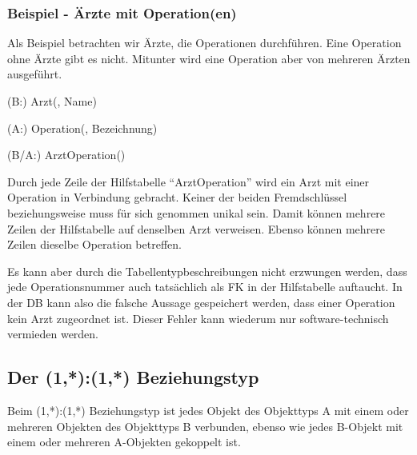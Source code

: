         \subsubsection{Beispiel - \"Arzte mit Operation(en)}
          Als Beispiel betrachten wir \"Arzte, die Operationen durchf\"uhren. Eine Operation ohne \"Arzte gibt es nicht. Mitunter wird eine Operation aber von mehreren \"Arzten ausgef\"uhrt.
          \begin{center}
          \end{center}
          \begin{small}
            (B:) Arzt(, Name)

            (A:) Operation(, Bezeichnung)

            (B/A:) ArztOperation()
          \end{small}
          Durch jede Zeile der Hilfstabelle \enquote{ArztOperation} wird ein Arzt mit einer Operation in Verbindung gebracht. Keiner der beiden Fremdschl\"ussel  beziehungsweise  muss f\"ur sich genommen unikal sein. Damit k\"onnen mehrere Zeilen der Hilfstabelle auf denselben Arzt verweisen. Ebenso k\"onnen mehrere Zeilen dieselbe Operation betreffen.

          Es kann aber durch die Tabellentypbeschreibungen nicht erzwungen werden, dass jede Operationsnummer auch tats\"achlich als FK in der Hilfstabelle auftaucht. In der DB kann also die falsche Aussage gespeichert werden, dass einer Operation kein Arzt zugeordnet ist. Dieser Fehler kann wiederum nur software-technisch vermieden werden.
      \subsection{Der (1,*):(1,*) Beziehungstyp}
        Beim (1,*):(1,*) Beziehungstyp ist jedes Objekt des Objekttyps A mit einem oder mehreren Objekten des Objekttyps B verbunden, ebenso wie jedes B-Objekt mit einem oder mehreren A-Objekten gekoppelt ist.

